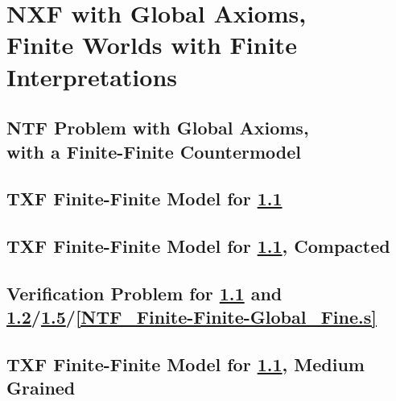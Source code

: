 \documentclass{easychair}
\begin{document}
\section{NXF with Global Axioms, \\
         Finite Worlds with Finite Interpretations}
\label{NXFGlobal}

\subsection{NTF Problem with Global Axioms, \\ with a Finite-Finite Countermodel}
\label{NTF_Finite-Finite-Global.p}
\begin{small}

\end{small}

\newpage
\subsection{TXF Finite-Finite Model for \ref{NTF_Finite-Finite-Global.p}}
\label{NTF_Finite-Finite-Global.s}
\begin{small}

\end{small}

\newpage
\subsection{TXF Finite-Finite Model for \ref{NTF_Finite-Finite-Global.p}, Compacted}
\label{NTF_Finite-Finite-Global_Compact.s}
\begin{small}

\end{small}

\newpage
\subsection{Verification Problem for \ref{NTF_Finite-Finite-Global.p} and 
\ref{NTF_Finite-Finite-Global.s}/\ref{NTF_Finite-Finite-Global_Medium.s}/\ref{NTF_Finite-Finite-Global_Fine.s}}
\label{NTF_Finite-Finite-Global.s.p}
\begin{small}

\end{small}

\newpage
\subsection{TXF Finite-Finite Model for \ref{NTF_Finite-Finite-Global.p}, Medium Grained}
\label{NTF_Finite-Finite-Global_Medium.s}
\begin{small}

\end{small}
\end{document}
